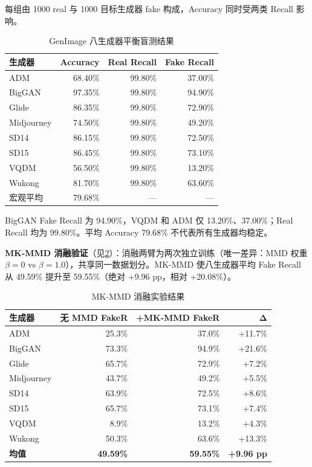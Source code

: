 \documentclass[UTF8, a4paper, 12pt]{ctexart}
\begin{document}
每组由 1000 real 与 1000 目标生成器 fake 构成，Accuracy 同时受两类 Recall 影响。

\begin{table}[H]
\centering
\caption{GenImage 八生成器平衡盲测结果}
\label{tab:table31}
\begin{tabular}{@{}lrrr@{}}
\toprule
\textbf{生成器} & \textbf{Accuracy} & \textbf{Real Recall} & \textbf{Fake Recall} \\
\midrule
ADM & 68.40\% & 99.80\% & 37.00\% \\
BigGAN & 97.35\% & 99.80\% & 94.90\% \\
Glide & 86.35\% & 99.80\% & 72.90\% \\
Midjourney & 74.50\% & 99.80\% & 49.20\% \\
SD14 & 86.15\% & 99.80\% & 72.50\% \\
SD15 & 86.45\% & 99.80\% & 73.10\% \\
VQDM & 56.50\% & 99.80\% & 13.20\% \\
Wukong & 81.70\% & 99.80\% & 63.60\% \\
\midrule
宏观平均 & 79.68\% & --- & --- \\
\bottomrule
\end{tabular}
\end{table}

BigGAN Fake Recall 为 94.90\%，VQDM 和 ADM 仅 13.20\%、37.00\%；Real Recall 均为 99.80\%。平均 Accuracy 79.68\% 不代表所有生成器均稳定。

\textbf{MK-MMD 消融验证}（见\cref{tab:table31b}）：消融两臂为两次独立训练（唯一差异：MMD 权重 $\beta=0$ vs $\beta=1.0$），共享同一数据划分。MK-MMD 使八生成器平均 Fake Recall 从 49.59\% 提升至 59.55\%（绝对 +9.96 pp，相对 +20.08\%）。

\begin{table}[H]
\centering
\caption{MK-MMD 消融实验结果}
\label{tab:table31b}
\begin{tabular}{@{}lrrr@{}}
\toprule
\textbf{生成器} & \textbf{无 MMD FakeR} & \textbf{+MK-MMD FakeR} & $\boldsymbol{\Delta}$ \\
\midrule
ADM & 25.3\% & 37.0\% & +11.7\% \\
BigGAN & 73.3\% & 94.9\% & +21.6\% \\
Glide & 65.7\% & 72.9\% & +7.2\% \\
Midjourney & 43.7\% & 49.2\% & +5.5\% \\
SD14 & 63.9\% & 72.5\% & +8.6\% \\
SD15 & 65.7\% & 73.1\% & +7.4\% \\
VQDM & 8.9\% & 13.2\% & +4.3\% \\
Wukong & 50.3\% & 63.6\% & +13.3\% \\
\midrule
\textbf{均值} & \textbf{49.59\%} & \textbf{59.55\%} & \textbf{+9.96 pp} \\
\bottomrule
\end{tabular}
\end{table}
\end{document}
